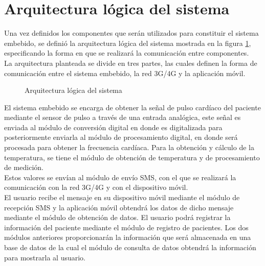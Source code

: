 \section{Arquitectura lógica del sistema}
Una vez definidos los componentes que serán utilizados para constituir el sistema embebido, se definió la arquitectura lógica del sistema mostrada en la figura \ref{fig:DisenoArquiLogica}, especificando la forma en que se realizará la comunicación entre componentes.\\

La arquitectura planteada se divide en tres partes, las cuales definen la forma de comunicación entre el sistema embebido, la red 3G/4G y la aplicación móvil.\\

\begin{figure}[htbp!]
	\centering
	\caption{Arquitectura lógica del sistema}
	\label{fig:DisenoArquiLogica}
\end{figure}

El sistema embebido se encarga de obtener la señal de pulso cardíaco del paciente mediante el sensor de pulso a través de una entrada analógica, este señal es enviada al módulo de conversión digital en donde es digitalizada para posteriormente enviarla al módulo de procesamiento digital, en donde será procesada para obtener la frecuencia cardíaca. Para la obtención y cálculo de la temperatura, se tiene el módulo de obtención de temperatura y de procesamiento de medición. \\

Estos valores se envían al módulo de envío SMS, con el que se realizará la comunicación con la red 3G/4G y con el dispositivo móvil. \\

El usuario recibe el mensaje en su dispositivo móvil mediante el módulo de recepción SMS y la aplicación móvil obtendrá los datos de dicho mensaje mediante el módulo de obtención de datos. El usuario podrá registrar la información del paciente mediante el módulo de registro de pacientes. Los dos módulos anteriores proporcionarán la información que será almacenada en una base de datos de la cual el módulo de consulta de datos obtendrá la información para mostrarla al usuario.